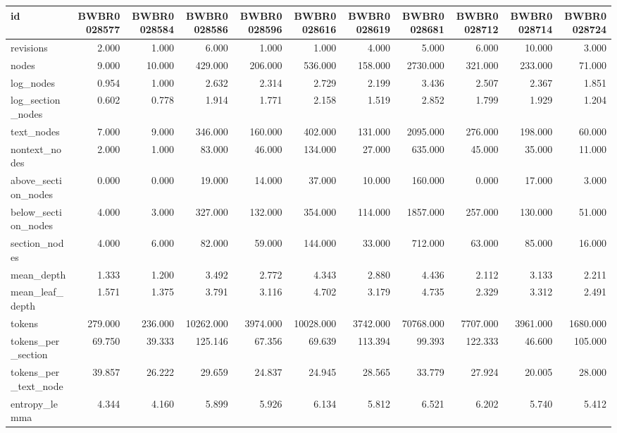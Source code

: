 \begin{tabular}{lrrrrrrrrrr}
\toprule
id & BWBR0028577 & BWBR0028584 & BWBR0028586 & BWBR0028596 & BWBR0028616 & BWBR0028619 & BWBR0028681 & BWBR0028712 & BWBR0028714 & BWBR0028724 \\
\midrule
revisions & 2.000 & 1.000 & 6.000 & 1.000 & 1.000 & 4.000 & 5.000 & 6.000 & 10.000 & 3.000 \\
\cline{1-11}
nodes & 9.000 & 10.000 & 429.000 & 206.000 & 536.000 & 158.000 & 2730.000 & 321.000 & 233.000 & 71.000 \\
\cline{1-11}
log\_nodes & 0.954 & 1.000 & 2.632 & 2.314 & 2.729 & 2.199 & 3.436 & 2.507 & 2.367 & 1.851 \\
\cline{1-11}
log\_section\_nodes & 0.602 & 0.778 & 1.914 & 1.771 & 2.158 & 1.519 & 2.852 & 1.799 & 1.929 & 1.204 \\
\cline{1-11}
text\_nodes & 7.000 & 9.000 & 346.000 & 160.000 & 402.000 & 131.000 & 2095.000 & 276.000 & 198.000 & 60.000 \\
\cline{1-11}
nontext\_nodes & 2.000 & 1.000 & 83.000 & 46.000 & 134.000 & 27.000 & 635.000 & 45.000 & 35.000 & 11.000 \\
\cline{1-11}
above\_section\_nodes & 0.000 & 0.000 & 19.000 & 14.000 & 37.000 & 10.000 & 160.000 & 0.000 & 17.000 & 3.000 \\
\cline{1-11}
below\_section\_nodes & 4.000 & 3.000 & 327.000 & 132.000 & 354.000 & 114.000 & 1857.000 & 257.000 & 130.000 & 51.000 \\
\cline{1-11}
section\_nodes & 4.000 & 6.000 & 82.000 & 59.000 & 144.000 & 33.000 & 712.000 & 63.000 & 85.000 & 16.000 \\
\cline{1-11}
mean\_depth & 1.333 & 1.200 & 3.492 & 2.772 & 4.343 & 2.880 & 4.436 & 2.112 & 3.133 & 2.211 \\
\cline{1-11}
mean\_leaf\_depth & 1.571 & 1.375 & 3.791 & 3.116 & 4.702 & 3.179 & 4.735 & 2.329 & 3.312 & 2.491 \\
\cline{1-11}
tokens & 279.000 & 236.000 & 10262.000 & 3974.000 & 10028.000 & 3742.000 & 70768.000 & 7707.000 & 3961.000 & 1680.000 \\
\cline{1-11}
tokens\_per\_section & 69.750 & 39.333 & 125.146 & 67.356 & 69.639 & 113.394 & 99.393 & 122.333 & 46.600 & 105.000 \\
\cline{1-11}
tokens\_per\_text\_node & 39.857 & 26.222 & 29.659 & 24.837 & 24.945 & 28.565 & 33.779 & 27.924 & 20.005 & 28.000 \\
\cline{1-11}
entropy\_lemma & 4.344 & 4.160 & 5.899 & 5.926 & 6.134 & 5.812 & 6.521 & 6.202 & 5.740 & 5.412 \\

\end{tabular}
